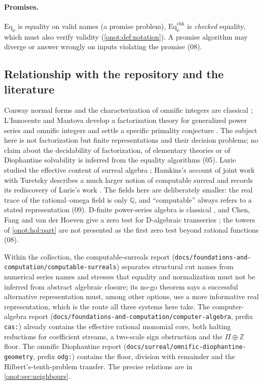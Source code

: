 \documentclass[11pt,oneside]{article}
\numberwithin{equation}{section}
\theoremstyle{definition}
\theoremstyle{remark}
\newcommand{\Z}{\mathbb Z}
\newcommand{\Q}{\mathbb Q}
\newcommand{\Eq}{\mathrm{Eq}}
\newcommand{\fn}[1]{\nolinkurl{#1}}
\begin{document}
\paragraph{Promises.} $\Eq_\nu$ is equality on valid names (a promise
problem), $\Eq^{\mathrm{chk}}_\nu$ is \emph{checked} equality, which must also
verify validity (\cref{onot:def:notation}). A promise algorithm may diverge or
answer wrongly on inputs violating the promise (08).

\subsection{Relationship with the repository and the literature}\label{onot:sub:repo}

Conway normal forms and the characterization of omnific integers are
classical \cite{Conway,Gonshor}; L'Innocente and Mantova develop a factorization
theory for generalized power series and omnific integers and settle a specific
primality conjecture \cite{LM}. The subject here is not factorization but finite
representations and their decision problems; no claim about the decidability of
factorization, of elementary theories or of Diophantine solvability is inferred
from the equality algorithms (05). Lurie studied the effective content of surreal
algebra \cite{Lurie}; Hamkins's account of joint work with Turetsky describes a
much larger notion of computable surreal and records its rediscovery of Lurie's
work \cite{Hamkins}. The fields here are deliberately smaller: the real trace of
the rational--omega field is only $\Q$, and ``computable'' always refers to a
stated representation (09). D-finite power-series algebra is classical
\cite{Stanley}, and Chen, Fang and van der Hoeven give a zero test for
D-algebraic transseries \cite{CFH}; the towers of \cref{onot:hol:part} are not
presented as the first zero test beyond rational functions (08).

Within the collection, the computable-surreals report
(\fn{docs/foundations-and-computation/computable-surreals}) separates structural
cut names from numerical series names and stresses that equality and
normalization must not be inferred from abstract algebraic closure; its no-go
theorem says a successful alternative representation must, among other options,
use a more informative real representation, which is the route all three systems
here take. The computer-algebra report
(\fn{docs/foundations-and-computation/computer-algebra}, prefix \texttt{cas:})
already contains the effective rational monomial core, both halting reductions
for coefficient streams, a two-scale sign obstruction and the $\Pi\oplus\Z$
floor. The omnific Diophantine report (\fn{docs/surreal/omnific-diophantine-geometry},
prefix \texttt{odg:}) contains the floor, division with remainder and the
Hilbert's-tenth-problem transfer. The precise relations are in
\cref{onot:sec:neighbours}.
\end{document}

